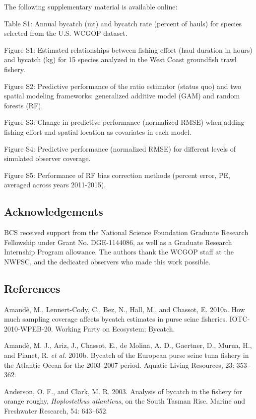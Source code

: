 \documentclass[]{article}
\begin{document}
The following supplementary material is available online:

Table S1: Annual bycatch (mt) and bycatch rate (percent of hauls) for
species selected from the U.S. WCGOP dataset.

Figure S1: Estimated relationships between fishing effort (haul duration
in hours) and bycatch (kg) for 15 species analyzed in the West Coast
groundfish trawl fishery.

Figure S2: Predictive performance of the ratio estimator (status quo)
and two spatial modeling frameworks: generalized additive model (GAM)
and random forests (RF).

Figure S3: Change in predictive performance (normalized RMSE) when
adding fishing effort and spatial location as covariates in each model.

Figure S4: Predictive performance (normalized RMSE) for different levels
of simulated observer coverage.

Figure S5: Performance of RF bias correction methods (percent error, PE,
averaged across years 2011-2015).

\subsection{Acknowledgements}\label{acknowledgements}

BCS received support from the National Science Foundation Graduate
Research Fellowship under Grant No. DGE-1144086, as well as a Graduate
Research Internship Program allowance. The authors thank the WCGOP staff
at the NWFSC, and the dedicated observers who made this work possible.

\subsection{References}\label{references}

\hypertarget{refs}{}
\hypertarget{ref-amande2010b}{}
Amandè, M., Lennert-Cody, C., Bez, N., Hall, M., and Chassot, E. 2010a.
How much sampling coverage affects bycatch estimates in purse seine
fisheries. IOTC-2010-WPEB-20. Working Party on Ecosystem; Bycatch.

\hypertarget{ref-amande2010a}{}
Amandè, M. J., Ariz, J., Chassot, E., de Molina, A. D., Gaertner, D.,
Murua, H., and Pianet, R. \emph{et al.} 2010b. Bycatch of the European
purse seine tuna fishery in the Atlantic Ocean for the 2003--2007
period. Aquatic Living Resources, 23: 353--362.

\hypertarget{ref-anderson2003}{}
Anderson, O. F., and Clark, M. R. 2003. Analysis of bycatch in the
fishery for orange roughy, \emph{Hoplostethus atlanticus}, on the South
Tasman Rise. Marine and Freshwater Research, 54: 643--652.
\end{document}
